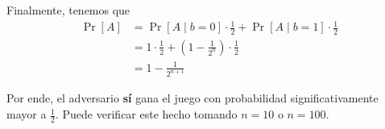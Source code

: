 Finalmente, tenemos que
\begin{align*}
    \Pr[A] & = \Pr[A \mid b = 0] \cdot \frac{1}{2} + \Pr[A \mid b = 1] \cdot \frac{1}{2} \\
           & = 1 \cdot \frac{1}{2} + \left(1 - \frac{1}{2^n}\right) \cdot \frac{1}{2} \\
           &= 1 - \frac{1}{2^{n+1}}
\end{align*}

Por ende, el adversario \textbf{sí} gana el juego con probabilidad significativamente mayor a $\frac{1}{2}$. Puede verificar este hecho tomando $n = 10$ o $n = 100$.